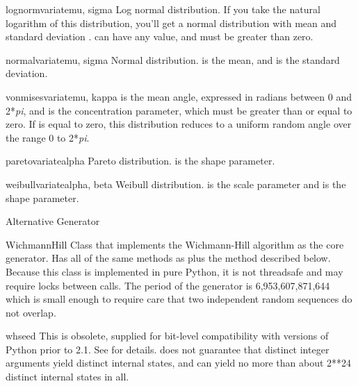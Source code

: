\begin{funcdesc}{lognormvariate}{mu, sigma}
  Log normal distribution.  If you take the natural logarithm of this
  distribution, you'll get a normal distribution with mean 
  and standard deviation .   can have any value,
  and  must be greater than zero.
\end{funcdesc}

\begin{funcdesc}{normalvariate}{mu, sigma}
  Normal distribution.   is the mean, and  is the
  standard deviation.
\end{funcdesc}

\begin{funcdesc}{vonmisesvariate}{mu, kappa}
   is the mean angle, expressed in radians between 0 and
  2*\emph{pi}, and  is the concentration parameter, which
  must be greater than or equal to zero.  If  is equal to
  zero, this distribution reduces to a uniform random angle over the
  range 0 to 2*\emph{pi}.
\end{funcdesc}

\begin{funcdesc}{paretovariate}{alpha}
  Pareto distribution.   is the shape parameter.
\end{funcdesc}

\begin{funcdesc}{weibullvariate}{alpha, beta}
  Weibull distribution.   is the scale parameter and
   is the shape parameter.
\end{funcdesc}

Alternative Generator

\begin{classdesc}{WichmannHill}{}
Class that implements the Wichmann-Hill algorithm as the core generator.
Has all of the same methods as  plus the 
method described below.  Because this class is implemented in pure
Python, it is not threadsafe and may require locks between calls.  The
period of the generator is 6,953,607,871,644 which is small enough to
require care that two independent random sequences do not overlap.
\end{classdesc}

\begin{funcdesc}{whseed}{}
  This is obsolete, supplied for bit-level compatibility with versions
  of Python prior to 2.1.
  See  for details.   does not guarantee
  that distinct integer arguments yield distinct internal states, and can
  yield no more than about 2**24 distinct internal states in all.
\end{funcdesc}


